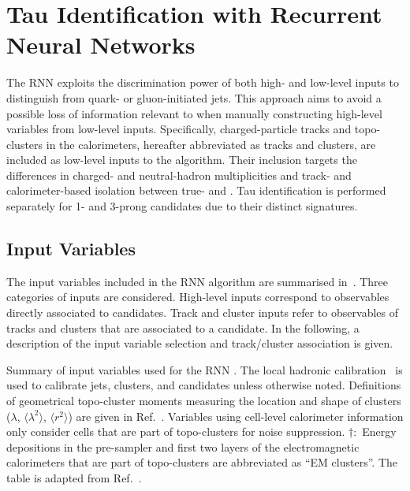 \section{Tau Identification with Recurrent Neural Networks}%
\label{sec:tauid_rnn}

The RNN \tauid exploits the discrimination power of both high- and low-level
inputs to distinguish \tauhad from quark- or gluon-initiated jets. This approach
aims to avoid a possible loss of information relevant to \tauid when manually
constructing high-level variables from low-level inputs. Specifically,
charged-particle tracks and topo-clusters in the calorimeters, hereafter
abbreviated as tracks and clusters, are included as low-level inputs to the
algorithm. Their inclusion targets the differences in charged- and
neutral-hadron multiplicities and track- and calorimeter-based isolation between
true- and \faketauhadvis. Tau identification is performed separately for 1- and
3-prong \tauhadvis candidates due to their distinct signatures.


\subsection{Input Variables}

The input variables included in the RNN \tauid algorithm are summarised
in~. Three categories of inputs are
considered. High-level inputs correspond to observables directly associated to
\tauhadvis candidates. Track and cluster inputs refer to observables of tracks
and clusters that are associated to a \tauhadvis candidate. In the following, a
description of the input variable selection and track/cluster association is
given.

\begin{table}[htbp]
  \centering

  \caption[Input variables used for the RNN \tauid.]{Summary of input variables
    used for the RNN \tauid. The local hadronic calibration~\cite{PERF-2014-07}
    is used to calibrate jets, clusters, and \tauhadvis candidates unless
    otherwise noted. Definitions of geometrical topo-cluster moments measuring
    the location and shape of clusters ($\lambda$, $\langle \lambda^2 \rangle$,
    $\langle r^2 \rangle$) are given in Ref.~\cite{PERF-2014-07}. Variables
    using cell-level calorimeter information only consider cells that are part
    of topo-clusters for noise suppression. $\dagger$:~Energy depositions in the
    pre-sampler and first two layers of the electromagnetic calorimeters that
    are part of topo-clusters are abbreviated as ``EM clusters''. The table is
    adapted from Ref.~\cite{ATL-PHYS-PUB-2019-033}.}%
  \label{tab:tauid_input_variables}

  \resizebox{0.99\textwidth}{!}{
    
  }
\end{table}

